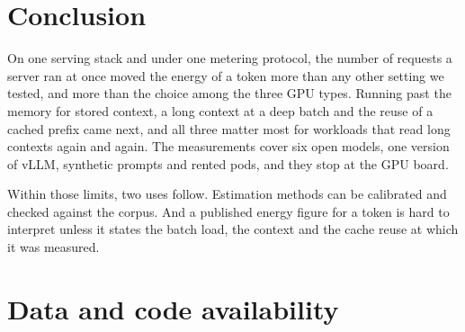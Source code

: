 \documentclass[11pt]{article}
\begin{document}
\section{Conclusion}\label{sec:conclusion}

On one serving stack and under one metering protocol, the number of requests a server ran at once moved the energy of a token more than any other setting we tested, and more than the choice among the three GPU types. Running past the memory for stored context, a long context at a deep batch and the reuse of a cached prefix came next, and all three matter most for workloads that read long contexts again and again. The measurements cover six open models, one version of vLLM, synthetic prompts and rented pods, and they stop at the GPU board.

Within those limits, two uses follow. Estimation methods can be calibrated and checked against the corpus. And a published energy figure for a token is hard to interpret unless it states the batch load, the context and the cache reuse at which it was measured.

\section{Data and code availability}\label{sec:data}
\end{document}

